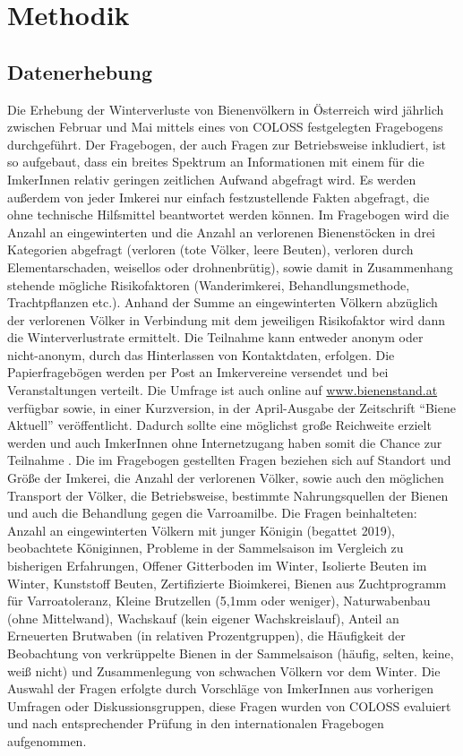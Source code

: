 \section{Methodik}

\subsection{Datenerhebung}

Die Erhebung der Winterverluste von Bienenvölkern in Österreich wird jährlich zwischen Februar und Mai mittels eines von COLOSS festgelegten Fragebogens durchgeführt. Der Fragebogen, der auch Fragen zur Betriebsweise inkludiert, ist so aufgebaut, dass ein breites Spektrum an Informationen mit einem für die ImkerInnen relativ geringen zeitlichen Aufwand abgefragt wird. Es werden außerdem von jeder Imkerei nur einfach festzustellende Fakten abgefragt, die ohne technische Hilfsmittel beantwortet werden können. Im Fragebogen wird die Anzahl an eingewinterten und die Anzahl an verlorenen Bienenstöcken in drei Kategorien abgefragt (verloren (tote Völker, leere Beuten), verloren durch Elementarschaden, weisellos oder drohnenbrütig), sowie damit in Zusammenhang stehende mögliche Risikofaktoren (Wanderimkerei, Behandlungsmethode, Trachtpflanzen etc.). Anhand der Summe an eingewinterten Völkern abzüglich der verlorenen Völker in Verbindung mit dem jeweiligen Risikofaktor wird dann die Winterverlustrate ermittelt.
\newline
Die Teilnahme kann entweder anonym oder nicht-anonym, durch das Hinterlassen von Kontaktdaten, erfolgen. Die Papierfragebögen werden per Post an Imkervereine versendet und bei Veranstaltungen verteilt. Die Umfrage ist auch online auf \url{www.bienenstand.at} verfügbar sowie, in einer Kurzversion, in der April-Ausgabe der Zeitschrift \enquote{Biene Aktuell} veröffentlicht. Dadurch sollte eine möglichst große Reichweite erzielt werden und auch ImkerInnen ohne Internetzugang haben somit die Chance zur Teilnahme \citep{vanderzee2013}.
\newline
Die im Fragebogen gestellten Fragen beziehen sich auf Standort und Größe der Imkerei, die Anzahl der verlorenen Völker, sowie auch den möglichen Transport der Völker, die Betriebsweise, bestimmte Nahrungsquellen der Bienen und auch die Behandlung gegen die Varroamilbe. Die Fragen beinhalteten: Anzahl an eingewinterten Völkern mit junger Königin (begattet 2019), beobachtete Königinnen, Probleme in der Sammelsaison im Vergleich zu bisherigen Erfahrungen, Offener Gitterboden im Winter, Isolierte Beuten im Winter, Kunststoff Beuten, Zertifizierte Bioimkerei, Bienen aus Zuchtprogramm für Varroatoleranz, Kleine Brutzellen (5,1mm oder weniger), Naturwabenbau (ohne Mittelwand), Wachskauf (kein eigener Wachskreislauf), Anteil an Erneuerten Brutwaben (in relativen Prozentgruppen), die Häufigkeit der Beobachtung von verkrüppelte Bienen in der Sammelsaison (häufig, selten, keine, weiß nicht) und Zusammenlegung von schwachen Völkern vor dem Winter. Die Auswahl der Fragen erfolgte durch Vorschläge von ImkerInnen aus vorherigen Umfragen oder Diskussionsgruppen, diese Fragen wurden von COLOSS evaluiert und nach entsprechender Prüfung in den internationalen Fragebogen aufgenommen.
